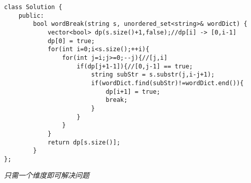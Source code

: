 \begin{description}
    \begin{lstlisting}
class Solution {
	public:
		bool wordBreak(string s, unordered_set<string>& wordDict) {
			vector<bool> dp(s.size()+1,false);//dp[i] -> [0,i-1]
			dp[0] = true;
			for(int i=0;i<s.size();++i){
				for(int j=i;j>=0;--j){//[j,i]
					if(dp[j+1-1]){//[0,j-1] == true;
						string subStr = s.substr(j,i-j+1);
						if(wordDict.find(subStr)!=wordDict.end()){
							dp[i+1] = true;
							break;
						}
					}
				}
			}
			return dp[s.size()];
	    }
};
    \end{lstlisting}
	\textit{只需一个维度即可解决问题}
\end{description}

